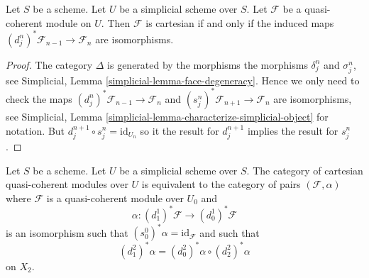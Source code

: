 \begin{lemma}
\label{lemma-check-cartesian-module}
Let $S$ be a scheme. Let $U$ be a simplicial scheme over $S$.
Let $\mathcal{F}$ be a quasi-coherent module on $U$.
Then $\mathcal{F}$ is cartesian if and only if the induced
maps $(d^n_j)^*\mathcal{F}_{n - 1} \to \mathcal{F}_n$ are
isomorphisms.
\end{lemma}

\begin{proof}
The category $\Delta$ is generated by the morphisms
the morphisms $\delta^n_j$ and $\sigma^n_j$, see
Simplicial, Lemma \ref{simplicial-lemma-face-degeneracy}.
Hence we only need to check the maps
$(d^n_j)^*\mathcal{F}_{n - 1} \to \mathcal{F}_n$
and $(s^n_j)^*\mathcal{F}_{n + 1} \to \mathcal{F}_n$ are
isomorphisms, see
Simplicial, Lemma \ref{simplicial-lemma-characterize-simplicial-object}
for notation. But $d_j^{n + 1} \circ s^n_j = \text{id}_{U_n}$
so it the result for $d^{n + 1}_j$ implies the result
for $s^n_j$.
\end{proof}

\begin{lemma}
\label{lemma-characterize-cartesian-modules}
Let $S$ be a scheme. Let $U$ be a simplicial scheme over $S$.
The category of cartesian quasi-coherent modules over $U$
is equivalent to the category of pairs $(\mathcal{F}, \alpha)$
where $\mathcal{F}$ is a quasi-coherent module over $U_0$
and
$$
\alpha : (d_1^1)^*\mathcal{F} \longrightarrow (d_0^1)^*\mathcal{F}
$$
is an isomorphism such that $(s_0^0)^*\alpha = \text{id}_\mathcal{F}$
and such that
$$
(d^2_1)^*\alpha = (d^2_0)^*\alpha \circ (d^2_2)^*\alpha
$$
on $X_2$.
\end{lemma}

